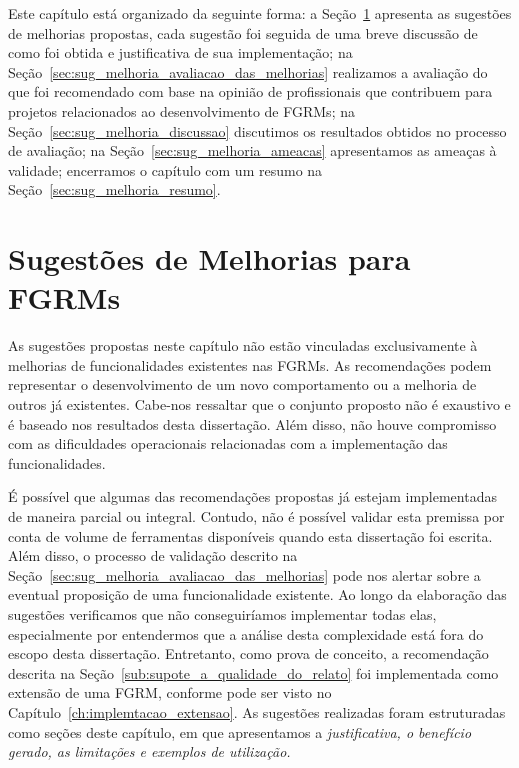 Este capítulo está organizado da seguinte forma: a
Seção~\ref{sec:sug_melhoria_melhorando_as_ferraementas} apresenta as sugestões
de melhorias propostas, cada sugestão foi seguida de uma breve discussão de como
foi obtida e justificativa de sua implementação; na
Seção~\ref{sec:sug_melhoria_avaliacao_das_melhorias} realizamos a avaliação do
que foi recomendado com base na opinião de profissionais que contribuem para
projetos relacionados ao desenvolvimento de FGRMs; na
Seção~\ref{sec:sug_melhoria_discussao} discutimos os resultados obtidos no
processo de avaliação; na Seção~\ref{sec:sug_melhoria_ameacas} apresentamos as
ameaças à validade; encerramos o capítulo com um resumo na
Seção~\ref{sec:sug_melhoria_resumo}.

\section{Sugestões de Melhorias para FGRMs}
\label{sec:sug_melhoria_melhorando_as_ferraementas}

As sugestões propostas neste capítulo não estão vinculadas exclusivamente à
melhorias de funcionalidades existentes nas FGRMs. As recomendações podem
representar o desenvolvimento de um novo comportamento ou a melhoria de outros
já existentes. Cabe-nos ressaltar que o conjunto proposto não é exaustivo e é
baseado nos resultados desta dissertação. Além disso, não houve compromisso com
as dificuldades operacionais relacionadas com a implementação das
funcionalidades.

É possível que algumas das recomendações propostas já estejam implementadas de
maneira parcial ou integral. Contudo, não é possível validar esta premissa por
conta de volume de ferramentas disponíveis quando esta dissertação foi escrita.
Além disso, o processo de validação descrito na
Seção~\ref{sec:sug_melhoria_avaliacao_das_melhorias} pode nos alertar sobre a
eventual proposição de uma funcionalidade existente. Ao longo da elaboração das
sugestões verificamos que não conseguiríamos implementar todas elas,
especialmente por entendermos que a análise desta complexidade está fora do
escopo desta dissertação. Entretanto, como prova de conceito, a recomendação
descrita na Seção~\ref{sub:supote_a_qualidade_do_relato} foi implementada como
extensão de uma FGRM, conforme pode ser visto no
Capítulo~\ref{ch:implemtacao_extensao}. As sugestões realizadas foram
estruturadas como seções deste capítulo, em que apresentamos a
\textit{justificativa, o benefício gerado, as limitações e exemplos de
    utilização.}

